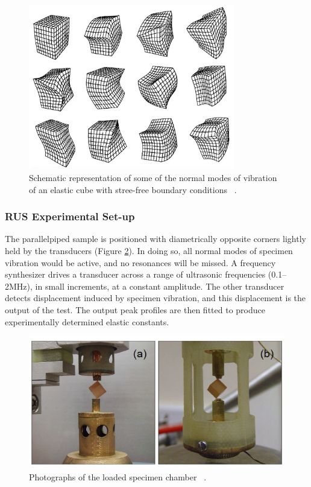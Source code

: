 %
\begin{figure}[H]
\begin{center}
\includegraphics[width=9cm]{rus_elastic}
\caption{Schematic representation of some of the normal modes of vibration of an elastic cube with stree-free boundary conditions ~\cite{maynard92}.}
\label{fig:rus_elastic}
\end{center}
\end{figure}
%

\subsubsection{RUS Experimental Set-up}

The parallelpiped sample is positioned with diametrically opposite corners lightly held by the transducers (Figure \ref{fig:rus_setup}).  In doing so, all normal modes of specimen vibration would be active, and no resonances will be missed.  A frequency synthesizer drives a transducer across a range of ultrasonic frequencies (0.1--2MHz), in small increments, at a constant amplitude.  The other transducer detects displacement induced by specimen vibration, and this displacement is the output of the test.  The output peak profiles are then fitted to produce experimentally determined elastic constants.  


%
\begin{figure}[H]
\begin{center}
\includegraphics[width=12cm]{rus_setup}
\caption{Photographs of the loaded specimen chamber ~\cite{mcknight09}.}
\label{fig:rus_setup}
\end{center}
\end{figure}
%

